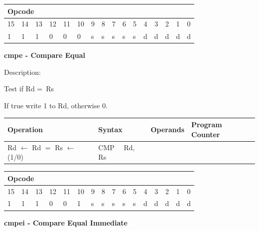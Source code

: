 \documentclass[%
	pdftex,
	a4paper,
	oneside,
	bibtotoc,%
	idxtotoc,%
	bibtotocnumbered,
	halfparskip,%
]{scrbook}
\begin{document}
\begin{tabular}{|c|c|c|c|c|c|c|c|c|c|c|c|c|c|c|c|}
\hline
\multicolumn{6}{|l|}{Opcode} & \multicolumn{5}{|l|}{} & \multicolumn{5}{|l|}{
} \\ \hline
15 & 14 & 13 & 12 & 11 & 10 & 9 & 8 & 7 & 6 & 5 & 4 & 3 & 2 & 1 & 0 \\ \hline
\multicolumn{1}{|l|}{1} & \multicolumn{1}{|l|}{1} & \multicolumn{1}{|l|}{1}
& \multicolumn{1}{|l|}{0} & \multicolumn{1}{|l|}{0} & \multicolumn{1}{|l|}{0}
& \multicolumn{1}{|l|}{s} & \multicolumn{1}{|l|}{s} & \multicolumn{1}{|l|}{s}
& \multicolumn{1}{|l|}{s} & \multicolumn{1}{|l|}{s} & \multicolumn{1}{|l|}{d}
& \multicolumn{1}{|l|}{d} & \multicolumn{1}{|l|}{d} & \multicolumn{1}{|l|}{d}
& \multicolumn{1}{|l|}{d} \\ \hline
\end{tabular}

\bigskip

\textbf{cmpe - Compare Equal}

Description:

Test if Rd =\ Rs

If true write 1 to Rd, otherwise 0.

\begin{tabular}{|l|l|l|l|}
\hline
Operation & Syntax & Operands & Program Counter \\ \hline
Rd $\leftarrow $ Rd $=$ Rs $\leftarrow $ (1/0) & CMP \ \ Rd, Rs &  &  \\ 
\hline
\end{tabular}

\begin{tabular}{|c|c|c|c|c|c|c|c|c|c|c|c|c|c|c|c|}
\hline
\multicolumn{6}{|l|}{Opcode} & \multicolumn{5}{|l|}{} & \multicolumn{5}{|l|}{
} \\ \hline
15 & 14 & 13 & 12 & 11 & 10 & 9 & 8 & 7 & 6 & 5 & 4 & 3 & 2 & 1 & 0 \\ \hline
\multicolumn{1}{|l|}{1} & \multicolumn{1}{|l|}{1} & \multicolumn{1}{|l|}{1}
& \multicolumn{1}{|l|}{0} & \multicolumn{1}{|l|}{0} & \multicolumn{1}{|l|}{1}
& \multicolumn{1}{|l|}{s} & \multicolumn{1}{|l|}{s} & \multicolumn{1}{|l|}{s}
& \multicolumn{1}{|l|}{s} & \multicolumn{1}{|l|}{s} & \multicolumn{1}{|l|}{d}
& \multicolumn{1}{|l|}{d} & \multicolumn{1}{|l|}{d} & \multicolumn{1}{|l|}{d}
& \multicolumn{1}{|l|}{d} \\ \hline
\end{tabular}

\bigskip

\textbf{cmpei - Compare Equal Immediate}
\end{document}
